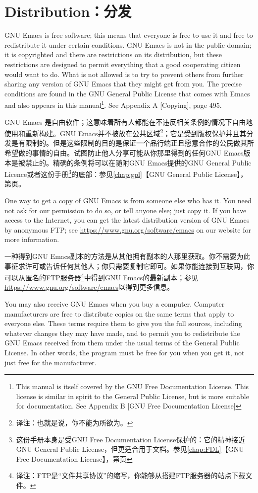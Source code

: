 \chapter{Distribution：分发}
GNU Emacs is free software; this means that everyone is free to use it and free to redistribute it under certain conditions. GNU Emacs is not in the public domain; it is copyrighted and there are restrictions on its distribution, but these restrictions are designed to permit everything that a good cooperating citizen would want to do. What is not allowed is to try to prevent others from further sharing any version of GNU Emacs that they might get from you. The precise conditions are found in the GNU General Public License that comes with Emacs and also appears in this manual\footnote{This manual is itself covered by the GNU Free Documentation License. This license is similar in spirit to the General Public License, but is more suitable for documentation. See Appendix B [GNU Free Documentation License]}. See Appendix A [Copying], page 495.\par
GNU Emacs 是自由软件；这意味着所有人都能在不违反相关条例的情况下自由地使用和重新构建。GNU Emacs并不被放在公共区域\footnote{译注：也就是说，你不能为所欲为。}；它是受到版权保护并且其分发是有限制的。但是这些限制的目的是保证一个品行端正且愿意合作的公民做其所希望做的事情的自由。试图防止他人分享可能从你那里得到的任何GNU Emacs版本是被禁止的。精确的条例将可以在随附GNU Emacs提供的GNU General Public Licence或者这份手册\footnote{这份手册本身是受GNU Free Documentation License保护的：它的精神接近GNU General Public License，但更适合用于文档。参见\ref{chap:FDL}【GNU Free Documentation License】，第\pageref{chap:FDL}页}的底部：参见\ref{chap:gpl}【GNU General Public License】，第\pageref{chap:gpl}页。\par
One way to get a copy of GNU Emacs is from someone else who has it. You need not ask for our permission to do so, or tell anyone else; just copy it. If you have access to the Internet, you can get the latest distribution version of GNU Emacs by anonymous FTP; see \url{https://www.gnu.org/software/emacs} on our website for more information.\par
一种得到GNU Emacs副本的方法是从其他拥有副本的人那里获取。你不需要为此事征求许可或告诉任何其他人；你只需要复制它即可。如果你能连接到互联网，你可以从匿名的FTP服务器\footnote{译注：FTP是“文件共享协议”的缩写，你能够从搭建FTP服务器的站点下载文件。}中得到GNU Emacs的最新副本；参见\url{https://www.gnu.org/software/emacs}以得到更多信息。\par
You may also receive GNU Emacs when you buy a computer. Computer manufacturers are free to distribute copies on the same terms that apply to everyone else. These terms require them to give you the full sources, including whatever changes they may have made, and to permit you to redistribute the GNU Emacs received from them under the usual terms of the General Public License. In other words, the program must be free for you when you get it, not just free for the manufacturer.\par
